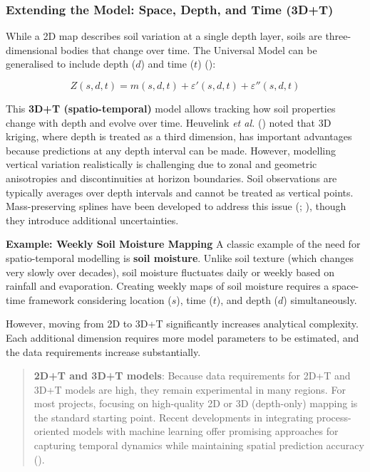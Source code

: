 \documentclass[
  10pt,
  b5paper,
  oneside]{book}
\begin{document}
\subsubsection{Extending the Model: Space, Depth, and Time (3D+T)}\label{extending-the-model-space-depth-and-time-3dt}

While a 2D map describes soil variation at a single depth layer, soils are three-dimensional bodies that change over time. The Universal Model can be generalised to include depth (\(d\)) and time (\(t\)) ():

\[Z(s, d, t) = m(s, d, t) + \varepsilon'(s, d, t) + \varepsilon''(s, d, t)\]

This \textbf{3D+T (spatio-temporal)} model allows tracking how soil properties change with depth and evolve over time. Heuvelink \emph{et al.} () noted that 3D kriging, where depth is treated as a third dimension, has important advantages because predictions at any depth interval can be made. However, modelling vertical variation realistically is challenging due to zonal and geometric anisotropies and discontinuities at horizon boundaries. Soil observations are typically averages over depth intervals and cannot be treated as vertical points. Mass-preserving splines have been developed to address this issue (; ), though they introduce additional uncertainties.

\textbf{Example: Weekly Soil Moisture Mapping}
A classic example of the need for spatio-temporal modelling is \textbf{soil moisture}. Unlike soil texture (which changes very slowly over decades), soil moisture fluctuates daily or weekly based on rainfall and evaporation. Creating weekly maps of soil moisture requires a space-time framework considering location (\(s\)), time (\(t\)), and depth (\(d\)) simultaneously.

However, moving from 2D to 3D+T significantly increases analytical complexity. Each additional dimension requires more model parameters to be estimated, and the data requirements increase substantially.

\begin{quote}
\textbf{2D+T and 3D+T models}: Because data requirements for 2D+T and 3D+T models are high, they remain experimental in many regions. For most projects, focusing on high-quality 2D or 3D (depth-only) mapping is the standard starting point. Recent developments in integrating process-oriented models with machine learning offer promising approaches for capturing temporal dynamics while maintaining spatial prediction accuracy ().
\end{quote}
\end{document}
